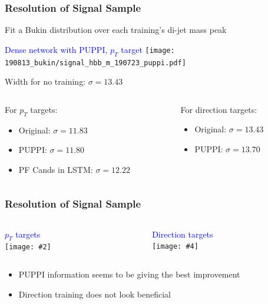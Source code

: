 \documentclass{beamer}
\newcommand{\twofigs}[4]{
  \begin{columns}
    \begin{column}{0.5\linewidth}
      \centering
      \textcolor{blue}{#1} \\
      \texttt{[image: \#2]}
    \end{column}
    \begin{column}{0.5\linewidth}
      \centering
      \textcolor{blue}{#3} \\
      \texttt{[image: \#4]}
    \end{column}
  \end{columns}
}
\begin{document}
\begin{frame}
  \frametitle{Resolution of Signal Sample}

  Fit a Bukin distribution over each training's di-jet mass peak

  \begin{center}
    \textcolor{blue}{Dense network with PUPPI, $p_T$ target}
    \texttt{[image: 190813\_bukin/signal\_hbb\_m\_190723\_puppi.pdf]}
  \end{center}

  Width for no training: $\sigma = 13.43$

  \vspace{12pt}

  \begin{columns}
    \begin{column}{0.5\linewidth}
      For $p_T$ targets:
      \begin{itemize}
      \item Original: $\sigma = 11.83$
      \item PUPPI: $\sigma = 11.80$
      \item PF Cands in LSTM: $\sigma = 12.22$
      \end{itemize}
    \end{column}
    \begin{column}{0.5\linewidth}
      For direction targets:
      \begin{itemize}
      \item Original: $\sigma = 13.43$
      \item PUPPI: $\sigma = 13.70$
        \phantom{\item PF Cands in LSTM: \\ $\sigma = 12.22$}
        \phantom{\item PF Cands in LSTM: \\ $\sigma = 12.22$}
      \end{itemize}
    \end{column}
  \end{columns}


\end{frame}

\begin{frame}
  \frametitle{Resolution of Signal Sample}

  \twofigs{$p_T$ targets}
          {190813_compare/comparison.pdf}
          {Direction targets}
          {190813_compare_direction/comparison.pdf}

  \begin{itemize}
  \item PUPPI information seems to be giving the best improvement
  \item Direction training does not look beneficial
  \end{itemize}


\end{frame}
\end{document}
